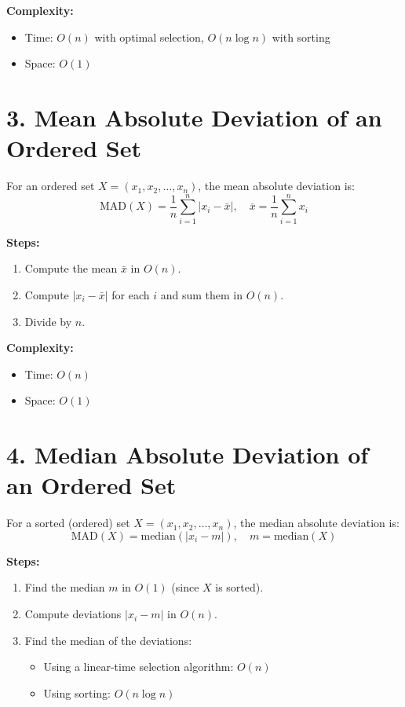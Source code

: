 \documentclass{article}
\begin{document}
\textbf{Complexity:}
\begin{itemize}
    \item Time: \( O(n) \) with optimal selection, \( O(n \log n) \) with sorting
    \item Space: \( O(1) \)
\end{itemize}

\section*{3. Mean Absolute Deviation of an Ordered Set}

For an ordered set \( X = (x_1, x_2, \dots, x_n) \), the mean absolute deviation is:
\begin{equation}
\text{MAD}(X) = \frac{1}{n} \sum_{i=1}^n |x_i - \bar{x}|, \quad \bar{x} = \frac{1}{n} \sum_{i=1}^n x_i
\end{equation}

\textbf{Steps:}
\begin{enumerate}
    \item Compute the mean \( \bar{x} \) in \( O(n) \).
    \item Compute \( |x_i - \bar{x}| \) for each \( i \) and sum them in \( O(n) \).
    \item Divide by \( n \).
\end{enumerate}

\textbf{Complexity:}
\begin{itemize}
    \item Time: \( O(n) \)
    \item Space: \( O(1) \)
\end{itemize}

\section*{4. Median Absolute Deviation of an Ordered Set}

For a sorted (ordered) set \( X = (x_1, x_2, \dots, x_n) \), the median absolute deviation is:
\begin{equation}
\text{MAD}(X) = \text{median}(|x_i - m|), \quad m = \text{median}(X)
\end{equation}

\textbf{Steps:}
\begin{enumerate}
    \item Find the median \( m \) in \( O(1) \) (since \( X \) is sorted).
    \item Compute deviations \( |x_i - m| \) in \( O(n) \).
    \item Find the median of the deviations:
    \begin{itemize}
        \item Using a linear-time selection algorithm: \( O(n) \)
        \item Using sorting: \( O(n \log n) \)
    \end{itemize}
\end{enumerate}
\end{document}

